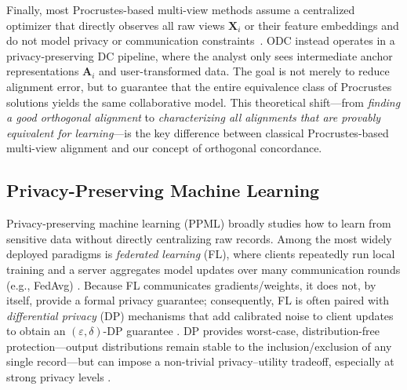 \documentclass[final,3p,times]{elsarticle}
\theoremstyle{plain}
\newcommand{\matr}[1]{\bm{#1}}        %
\begin{document}
Finally, most Procrustes-based multi-view methods assume a centralized optimizer that directly observes all raw views $\matr{X}_i$ or their feature embeddings and do not model privacy or communication constraints~\cite{Nie2018AWP, Dong2022GrassmannProcrustes, Grave2019WassersteinProcrustes, Peng2021ProcrustesKGE}. ODC instead operates in a privacy-preserving DC pipeline, where the analyst only sees intermediate anchor representations $\matr{A}_i$ and user-transformed data. The goal is not merely to reduce alignment error, but to guarantee that the entire equivalence class of Procrustes solutions yields the same collaborative model. This theoretical shift---from \emph{finding a good orthogonal alignment} to \emph{characterizing all alignments that are provably equivalent for learning}---is the key difference between classical Procrustes-based multi-view alignment and our concept of orthogonal concordance.


\subsection{Privacy-Preserving Machine Learning}
\label{subsection: PPML}

Privacy-preserving machine learning (PPML) broadly studies how to learn from sensitive data without directly centralizing raw records. Among the most widely deployed paradigms is \emph{federated learning} (FL), where clients repeatedly run local training and a server aggregates model updates over many communication rounds (e.g., FedAvg) \cite{FL1}. Because FL communicates gradients/weights, it does not, by itself, provide a formal privacy guarantee; consequently, FL is often paired with \emph{differential privacy} (DP) mechanisms that add calibrated noise to client updates to obtain an $(\varepsilon,\delta)$-DP guarantee \cite{DP, NbaFL}. DP provides worst-case, distribution-free protection—output distributions remain stable to the inclusion/exclusion of any single record—but can impose a non-trivial privacy--utility tradeoff, especially at strong privacy levels \cite{DP}.
\end{document}
